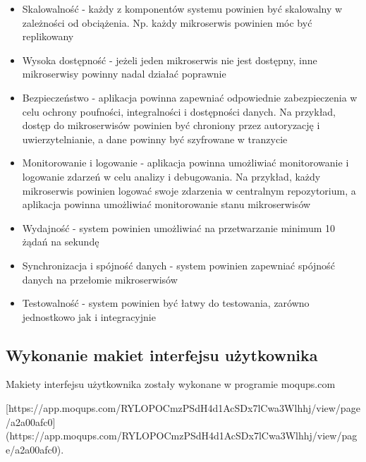 \begin{itemize}
    \item Skalowalność - każdy z komponentów systemu powinien być skalowalny w zależności od obciążenia. Np. każdy mikroserwis powinien móc być replikowany
    \item Wysoka dostępność - jeżeli jeden mikroserwis nie jest dostępny, inne mikroserwisy powinny nadal działać poprawnie
    \item Bezpieczeństwo - aplikacja powinna zapewniać odpowiednie zabezpieczenia w celu ochrony poufności, integralności i dostępności danych. Na przykład, dostęp do mikroserwisów powinien być chroniony przez autoryzację i uwierzytelnianie, a dane powinny być szyfrowane w tranzycie
    \item Monitorowanie i logowanie - aplikacja powinna umożliwiać monitorowanie i logowanie zdarzeń w celu analizy i debugowania. Na przykład, każdy mikroserwis powinien logować swoje zdarzenia w centralnym repozytorium, a aplikacja powinna umożliwiać monitorowanie stanu mikroserwisów
    \item Wydajność - system powinien umożliwiać na przetwarzanie minimum 10 żądań na sekundę
    \item Synchronizacja i spójność danych - system powinien zapewniać spójność danych na przełomie mikroserwisów
    \item Testowalność - system powinien być łatwy do testowania, zarówno jednostkowo jak i integracyjnie
\end{itemize}

\subsection{Wykonanie makiet interfejsu użytkownika}

Makiety interfejsu użytkownika zostały wykonane w programie moqups.com

[https://app.moqups.com/RYLOPOCmzPSdH4d1AcSDx7lCwa3Wlhhj/view/page/a2a00afc0](https://app.moqups.com/RYLOPOCmzPSdH4d1AcSDx7lCwa3Wlhhj/view/page/a2a00afc0).